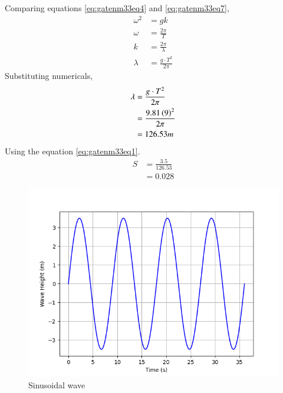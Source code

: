 \documentclass[journal,12pt,onecolumn]{IEEEtran}
\theoremstyle{remark}
\begin{document}
Comparing equations \eqref{eq:gatenm33eq4} and \eqref{eq:gatenm33eq7},\\
\begin{align}
\omega^2 &= gk \label{eq:gatenm33eq8} \\
\omega &= \frac{2 \pi}{T} \label{eq:gatenm33eq9} \\
k &= \frac{2 \pi}{\lambda} \label{eq:gatenm33eq10} \\
\lambda &= \frac{g \cdot T^2}{2 \pi} \label{eq:gatenm33eq11}
\end{align}
Substituting numericals,\\
\begin{align}
\lambda&=\frac{g \cdot T^2}{2\pi}\\ 
&=\frac{9.81 \left(9\right)^2}{2\pi}\\ 
&=126.53m 
\end{align}
Using the equation \eqref{eq:gatenm33eq1}.\\
\begin{align}
S&=\frac{3.5}{126.53}\\ 
&=0.028 
\end{align}
\begin{figure}[h]
    \centering
    \includegraphics[width=\columnwidth]{figs/plot.png}
    \caption{Sinusoidal wave}
    \label{fig:}
\end{figure} 
\end{document}

